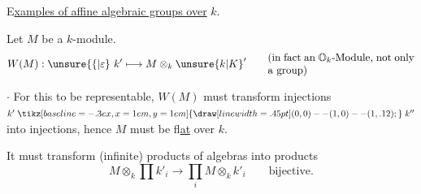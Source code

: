 E\uline{xamples of affine algebraic groups over} $k$.


Let $M$ be a $k$-module.
\[
 W(M):\unsure{\{|\varepsilon}\ k'\longmapsto M\otimes_k \unsure{k|K}'
 \qquad\text{\parbox{.4\linewidth}{(in fact an $\mathbb{O}_k$-Module, not only a group)}}
\]

$\cdot$ For this to be representable, $W(M)$ must transform injections $k'\mathrel{\tikz[baseline=-.3ex,x=1em,y=1em]{\draw[line width=.45pt] (0,0)--(1,0)--(1,.12);}} k''$ into injections, hence $M$ must be f\uline{lat} over $k$. 

It must transform (infinite) products of algebras into products
\[
 M\otimes_k\prod k'_i\longrightarrow\prod_i M\otimes_k k'_i
 \qquad\text{bijective.}
\]

